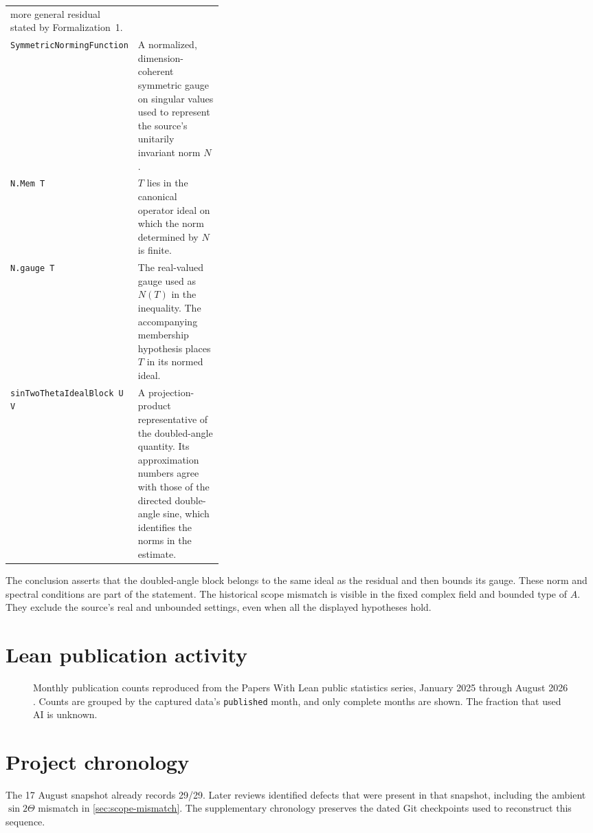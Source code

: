\begin{table}[H]
\begin{tabularx}{\linewidth}{@{}>{\raggedright\arraybackslash}p{0.36\linewidth}>{\raggedright\arraybackslash}X@{}}
    more general residual stated by Formalization~1. \\
\texttt{SymmetricNormingFunction}
  & A normalized, dimension-coherent symmetric gauge on singular values used to
    represent the source's unitarily invariant norm $N$. \\
\texttt{N.Mem T}
  & $T$ lies in the canonical operator ideal on which the norm determined by
    $N$ is finite. \\
\texttt{N.gauge T}
  & The real-valued gauge used as $N(T)$ in the inequality.  The accompanying
    membership hypothesis places $T$ in its normed ideal. \\
\texttt{sinTwoThetaIdealBlock U V}
  & A projection-product representative of the doubled-angle quantity.
    Its approximation numbers agree with those of the directed double-angle
    sine, which identifies the norms in the estimate. \\
\bottomrule
\end{tabularx}
\end{table}

The conclusion asserts that the doubled-angle block belongs to the same ideal
as the residual and then bounds its gauge.  These norm and spectral conditions
are part of the statement.  The historical scope mismatch is visible in the
fixed complex field and bounded type of $A$.  They exclude the source's real
and unbounded settings, even when all the displayed hypotheses hold.

\section{Lean publication activity}

\begin{figure}[H]
  \centering
  
  \caption{Monthly publication counts reproduced from the Papers With Lean
  public statistics series, January 2025 through August 2026
  \citep{paperswithlean2026stats}.  Counts are grouped by the captured data's
  \texttt{published} month, and only complete months are shown.  The fraction
  that used AI is unknown.}
  \label{fig:lean-activity}
\end{figure}

\section{Project chronology}

The 17 August snapshot already records 29/29.  Later reviews identified defects
that were present in that snapshot, including the ambient $\sin 2\Theta$ mismatch
in \cref{sec:scope-mismatch}.  The supplementary chronology preserves the dated
Git checkpoints used to reconstruct this sequence.

